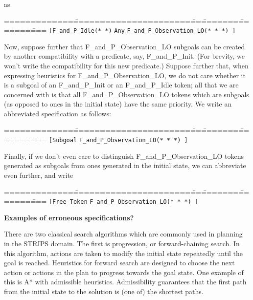 as

\begin{tabbing}
=============\=======================\===\========\========\====\kill
{\tt[F\_and\_P\_Idle(* *)} \> {\tt Any} {\tt  F\_and\_P\_Observation\_LO(* * *) ]} \\  
\end{tabbing}

Now, suppose further that F\_and\_P\_Observation\_LO subgoals can be created by
another compatibility with a predicate, say, F\_and\_P\_Init.  (For brevity, we won't
write the compatibility for this new predicate.)  Suppose further that, when expressing
heuristics for F\_and\_P\_Observation\_LO, we do not care whether it is a subgoal of
an F\_and\_P\_Init or an F\_and\_P\_Idle token; all that we are concerned with is that
all F\_and\_P\_Observation\_LO tokens which are subgoals (as opposed to ones in the initial
state) have the same priority.  We write an abbreviated specification as follows:
\begin{tabbing}
=============\=======================\===\========\========\====\kill
{\tt [Subgoal} \> {\tt  F\_and\_P\_Observation\_LO(* * *) ]} \\  
\end{tabbing}

Finally, if we don't even care to distinguish F\_and\_P\_Observation\_LO tokens
generated as subgoals from ones generated in the initial state, we can abbreviate
even further, and write 

\begin{tabbing}
=============\=======================\===\========\========\====\kill
{\tt [Free\_Token} \> {\tt  F\_and\_P\_Observation\_LO(* * *) ]} \\  
\end{tabbing}

{\bf Examples of erroneous specifications?}

There are two classical search algorithms which are commonly used in
planning in the STRIPS domain.  The first is progression, or
forward-chaining search.  In this algorithm, actions are taken to
modify the initial state repeatedly until the goal is reached.
Heuristics for forward search are designed to choose the next action
or actions in the plan to progress towards the goal state.  One
example of this is A* with admissible heuristics.  Admissibility
guarantees that the first path from the initial state to the solution
is (one of) the shortest paths.

